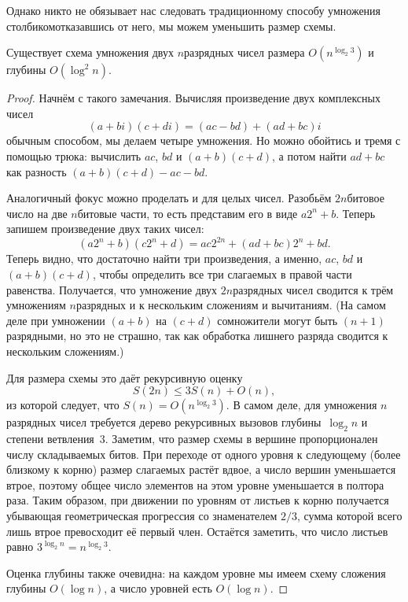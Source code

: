 Однако никто не обязывает нас следовать традиционному способу
умножения столбиком\т отказавшись от него, мы можем уменьшить
размер схемы.

\begin{theorem}
        \label{recursive-multiplication}
Существует схема умножения двух $n$\д разрядных
чисел размера $O(n^{\log_2 3})$ и глубины $O(\log^2 n)$.
\end{theorem}

\begin{proof}
Начнём с такого замечания. Вычисляя произведение двух
комплексных чисел
        $$
(a+bi)(c+di)=(ac-bd)+(ad+bc)i
        $$
обычным способом, мы делаем четыре умножения. Но можно обойтись
и тремя с помощью трюка: вычислить $ac$, $bd$ и
$(a+b)(c+d)$, а потом найти $ad+bc$ как разность
$(a+b)(c+d)-ac-bd$.

Аналогичный фокус можно проделать и для целых чисел. Разобьём
$2n$\д битовое число на две $n$\д битовые части, то есть представим
его в виде $a2^n+b$. Теперь запишем произведение двух таких чисел:
        $$
(a2^n+b)(c2^n+d)=ac2^{2n}+(ad+bc)2^n+bd.
        $$
Теперь видно, что достаточно найти три произведения, а именно,
$ac$, $bd$ и $(a+b)(c+d)$, чтобы определить
все три слагаемых в правой части равенства.
Получается, что умножение двух $2n$\д разрядных чисел сводится
к трём умножениям $n$\д разрядных и к нескольким сложениям и
вычитаниям. (На самом деле при умножении $(a+b)$ на $(c+d)$
сомножители могут быть $(n+1)$\д разрядными, но это не страшно,
так как обработка лишнего разряда сводится к нескольким
сложениям.)

Для размера схемы это даёт рекурсивную оценку
        $$
S(2n)\le 3S(n)+O(n),
        $$
из которой следует, что $S(n)=O(n^{\log_2 3})$. В самом деле,
для умножения $n$\д разрядных чисел требуется дерево рекурсивных
вызовов глубины~$\log_2 n$ и степени ветвления~$3$. Заметим, что
размер схемы в вершине пропорционален числу складываемых битов.
При переходе от одного уровня к следующему (более близкому к
корню) размер слагаемых растёт вдвое, а число вершин уменьшается
втрое, поэтому общее число элементов на этом уровне уменьшается
в полтора раза. Таким образом, при движении по уровням от
листьев к корню получается убывающая геометрическая прогрессия
со знаменателем $2/3$, сумма которой всего лишь втрое
превосходит её первый член. Остаётся заметить, что число
листьев равно $3^{\log_2 n}=n^{\log_2 3}$.

Оценка глубины также очевидна: на каждом уровне мы имеем
схему сложения глубины $O(\log n)$, а число уровней есть
$O(\log n)$.
\end{proof}

